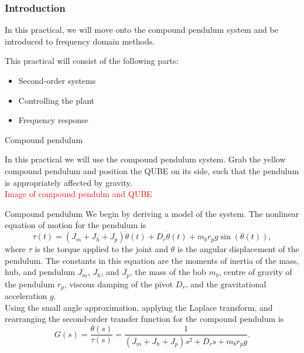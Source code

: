 \documentclass[9pt]{beamer-control}
\begin{document}

\begin{frame}
\frametitle{Introduction}
In this practical, we will move onto the compound pendulum system and be introduced to frequency domain methods.

\vfill

This practical will consist of the following parts:
\begin{itemize}
\item Second-order systems
\item Controlling the plant
\item Frequency response
\end{itemize}
\end{frame}


\begin{frame}{Compound pendulum}

In this practical we will use the compound pendulum system.
Grab the yellow compound pendulum and position the QUBE on its side, such that the pendulum is appropriately affected by gravity.\\

\textcolor{red}{Image of compound pendulm and QUBE}

\end{frame}


\begin{frame}{Compound pendulum}
	We begin by deriving a model of the system.
The nonlinear equation of motion for the pendulum is 
\[\tau(t) = (J_m+J_h+J_p) \ddot{\theta}(t) + D_r \dot{\theta}(t) + m_b r_p g \sin \left(\theta (t)\right), \]
where $\tau$ is the torque applied to the joint and $\theta$ is the angular displacement of the pendulum. The constants in this equation are the moments of inertia of the mass, hub, and pendulum $J_m$, $J_h$, and $J_p$, the mass of the bob $m_b$, centre of gravity of the pendulum $r_p$, viscous damping of the pivot $D_r$, and the gravitational acceleration $g$.\\

Using the small angle approximation, applying the Laplace transform, and rearranging the second-order transfer function for the compound pendulum is 
\[ G(s) = \frac{\theta(s)}{\tau (s)} = \frac{1}{(J_m+J_h+J_p)s^2 + D_r s + m_b r_p g } .\]

\end{frame}
\end{document}

